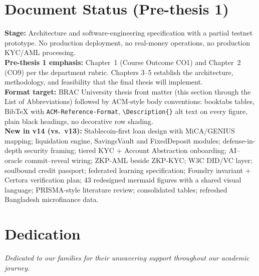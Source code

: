 \documentclass[12pt,a4paper]{report}
\begin{document}
\newpage
\thispagestyle{empty}

\chapter*{Document Status (Pre-thesis 1)}
{}

\noindent\textbf{Stage:} Architecture and software-engineering specification with a partial testnet prototype. No production deployment, no real-money operations, no production KYC/AML processing.\\[2pt]
\noindent\textbf{Pre-thesis 1 emphasis:} Chapter~1 (Course Outcome CO1) and Chapter~2 (CO9) per the department rubric. Chapters 3--5 establish the architecture, methodology, and feasibility that the final thesis will implement.\\[2pt]
\noindent\textbf{Format target:} BRAC University thesis front matter (this section through the List of Abbreviations) followed by ACM-style body conventions: booktabs tables, BibTeX with \texttt{ACM-Reference-Format}, \texttt{\textbackslash Description\{\}} alt text on every figure, plain black headings, no decorative row shading.\\[2pt]
\noindent\textbf{New in v14 (vs.\ v13):} Stablecoin-first loan design with MiCA/GENIUS mapping; liquidation engine, SavingsVault and FixedDeposit modules; defense-in-depth security framing; tiered KYC + Account Abstraction onboarding; AI--oracle commit--reveal wiring; ZKP-AML beside ZKP-KYC; W3C DID/VC layer; soulbound credit passport; federated learning specification; Foundry invariant + Certora verification plan; 43 redesigned mermaid figures with a shared visual language; PRISMA-style literature review; consolidated tables; refreshed Bangladesh microfinance data.

\newpage
\thispagestyle{empty}

\chapter*{Dedication}
{}

\vspace{3cm}
\begin{center}
\textit{Dedicated to our families for their unwavering support throughout our academic journey.}
\end{center}
\end{document}

